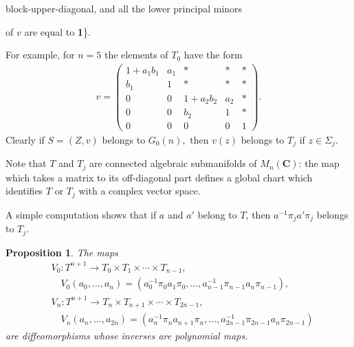 \documentclass{surv-l}
\theoremstyle{plain}
\newtheorem{prop}[theorem]{Proposition}
\theoremstyle{definition}
\numberwithin{equation}{chapter}
\begin{document}
\qquad \qquad block-upper-diagonal, and all the lower principal minors

\qquad \qquad \qquad \qquad \qquad \qquad \qquad \qquad \qquad\qquad\qquad of $v$ are equal to \textbf{1}\}.

For example, for $n=5$ the elements of $T_{0}$ have the form
\begin{align*}
v= \left(\begin{array}{ccccc}
1+a_{1}b_{1} & a_{1} & \ast & \ast & \ast\\
b_{1} & 1 & \ast & \ast & \ast\\
0 & 0 & 1+a_{2}b_{2} & a_{2} & \ast\\
0 & 0 & b_{2} & 1 & \ast\\
0 & 0 & 0 & 0 & 1
\end{array}\right).
\end{align*}
Clearly if $S=(Z, v)$ belongs to $G_{0}(n),$ then $v(z)$ belongs to $T_{j}$ if $z\in\Sigma_{j}$.

Note that $T$ and $T_{j}$ are connected algebraic submanifolds of $M_{n}(\textbf{C})$: the map which takes a matrix to its off-diagonal part defines a global chart which identifies $T$ or $T_{j}$ with a complex vector space.

A simple computation shows that if $a$ and $a'$ belong to $T$, then $a^{-1}\pi_{j}a'\pi_{j}$ belongs to $T_{j}$.
\renewcommand\thetheorem{25.5}
\setcounter{theorem}{0}
\begin{prop}\label{pro25.5}
The maps
\renewcommand\theequation{25.\arabic{equation}}
\setcounter{equation}{5}
\begin{align}\label{eq25.6}
& V_{0}:T^{n+1}\rightarrow T_{0}\times T_{1}\times\cdots \times T_{n-1}, \\
&\quad V_{0}(a_{0},\ldots,a_{n})=(a_{0}^{-1}\pi_{0}a_{1}\pi_{0}, \ldots,a_{n-1}^{-1}\pi_{n-1}a_{n}\pi_{n-1}),\nonumber\\
& V_{n}:T^{n+1}\rightarrow T_{n}\times T_{n+1}\times \cdots \times T_{2n-1},\\
&\quad V_{n}(a_{n},\ldots,a_{2n})=(a_{n}^{-1}\pi_{n}a_{n+1}\pi_{n},\ldots, a_{2n-1}^{-1}\pi_{2n-1}a_{n}\pi_{2n-1})\nonumber
\end{align}
are diffeomorphisms whose inverses are polynomial maps.
\end{prop}
\end{document}
